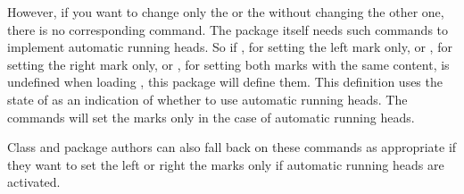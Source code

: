   However, if you want to change only the  or the 
   without changing the other one, there is no corresponding
  command. The  package itself needs such commands to implement automatic running heads.
  So if , for setting the left mark only, or ,
  for setting the right mark only, or , for setting both
  marks with the same content, is undefined when loading 
  , this package will define them. This definition uses the state of
   as an indication of whether to use automatic running heads.
  The commands will set the marks only in the case of automatic running heads.

  Class and package authors can also fall back on these commands as appropriate
  if they want to set the left or right the marks only if automatic running
  heads are activated.%
  \EndIndexGroup%
\fi%

%
\EndIndexGroup


